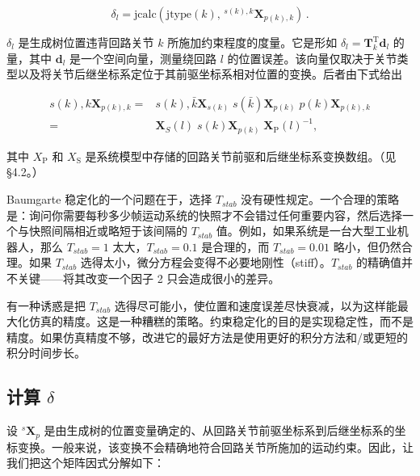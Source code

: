 \documentclass[10pt,a4paper]{book}
\theoremstyle{thmstyle} %
\theoremstyle{defstyle} %
\theoremstyle{prostyle} %
\begin{document}
$$
\delta _ { l } = \mathrm { j c a l c } ( \mathrm { j t y p e } ( k ) , \, ^{s ( k ) , k} \mathbf { X } _ { p ( k ) , k } ) \, .
$$



$\delta_{l}$ 是生成树位置违背回路关节 $k$ 所施加约束程度的度量。它是形如 $\delta_{l}=\boldsymbol{T}_{k}^{\mathrm{T}}\boldsymbol{d}_{l}$ 的量，其中 $\boldsymbol{d}_{l}$ 是一个空间向量，测量绕回路 $l$ 的位置误差。该向量仅取决于关节类型以及将关节后继坐标系定位于其前驱坐标系相对位置的变换。后者由下式给出



$$
\begin{array}{rl} { s ( k ) , k \mathbf { X } _ { p ( k ) , k } = } & { s ( k ) , \bar { k } \mathbf { X } _ { s ( k ) } \; s ( \bar { k } ) \mathbf { X } _ { p ( k ) } \; p ( k ) \mathbf { X } _ { p ( k ) , k } } \\{ = } & { \mathbf { X } _ { S } ( l ) \; s ( k ) \mathbf { X } _ { p ( k ) } \; \mathbf { X } _ { \mathrm { P } } ( l ) ^{- 1} , } \end{array}
$$



其中 $X_{\mathrm{P}}$ 和 $X_{\mathrm{S}}$ 是系统模型中存储的回路关节前驱和后继坐标系变换数组。（见 §4.2。）



Baumgarte 稳定化的一个问题在于，选择 $T_{stab}$ 没有硬性规定。一个合理的策略是：询问你需要每秒多少帧运动系统的快照才不会错过任何重要内容，然后选择一个与快照间隔相近或略短于该间隔的 $T_{stab}$ 值。例如，如果系统是一台大型工业机器人，那么 $T_{stab} = 1$ 太大，$T_{stab} = 0.1$ 是合理的，而 $T_{stab} = 0.01$ 略小，但仍然合理。如果 $T_{stab}$ 选得太小，微分方程会变得不必要地刚性（stiff）。$T_{stab}$ 的精确值并不关键——将其改变一个因子 2 只会造成很小的差异。



有一种诱惑是把 $T_{stab}$ 选得尽可能小，使位置和速度误差尽快衰减，以为这样能最大化仿真的精度。这是一种糟糕的策略。约束稳定化的目的是实现稳定性，而不是精度。如果仿真精度不够，改进它的最好方法是使用更好的积分方法和/或更短的积分时间步长。



\subsection{计算 $\delta$}





设 $^{s}\mathbf{X}_{p}$ 是由生成树的位置变量确定的、从回路关节前驱坐标系到后继坐标系的坐标变换。一般来说，该变换不会精确地符合回路关节所施加的运动约束。因此，让我们把这个矩阵因式分解如下：
\end{document}
